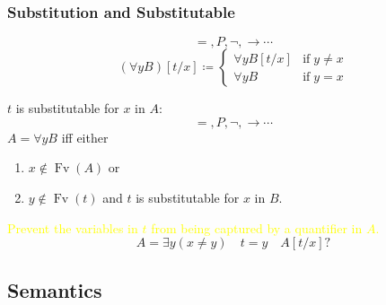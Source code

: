 \documentclass[UTF8,11pt,colorlinks,compress,openany]{beamer}%
\begin{document}
\begin{frame}\frametitle{Substitution and Substitutable}
\setlength\abovedisplayskip{0pt}
\setlength\belowdisplayskip{0pt}
	\begin{definition}
		\[=,P,\neg,\to\cdots\]
		\[(\forall y B)[t/x]\coloneqq 
			\begin{cases}
			\forall y B[t/x] &\text{if}\;y\ne x\\
			\forall y B &\text{if}\;y=x
			\end{cases}\]
	\end{definition}
	\begin{definition}[Substitutable]
		$t$ is substitutable for $x$ in $A$:
		\[=,P,\neg,\to\cdots\]
		$A=\forall y B$ iff either
		\begin{enumerate}
			\item $x\notin \operatorname{Fv}(A)$ or
			\item $y\notin \operatorname{Fv}(t)$ and $t$ is substitutable for $x$ in $B$.
		\end{enumerate}
	\end{definition}
\textcolor{yellow}{Prevent the variables in $t$ from being captured by a quantifier in $A$.}
	\[A=\exists y(x\ne y)\quad t=y\quad A[t/x]?\]
\end{frame}

\subsection{Semantics}
\end{document}
